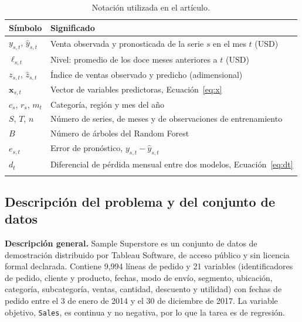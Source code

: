 \documentclass[pdflatex,sn-mathphys-num]{sn-jnl}
\begin{document}
\begin{table}[!htb]
\caption{Notación utilizada en el artículo.}\label{tab:notacion}
\begin{tabular}{@{}ll@{}}
\toprule
Símbolo & Significado \\
\midrule
$y_{s,t}$, $\hat{y}_{s,t}$ & Venta observada y pronosticada de la serie $s$ en el mes $t$ (USD) \\
$\ell_{s,t}$ & Nivel: promedio de los doce meses anteriores a $t$ (USD) \\
$z_{s,t}$, $\hat{z}_{s,t}$ & Índice de ventas observado y predicho (adimensional) \\
$\mathbf{x}_{s,t}$ & Vector de variables predictoras, Ecuación~\eqref{eq:x} \\
$c_s$, $r_s$, $m_t$ & Categoría, región y mes del año \\
$S$, $T$, $n$ & Número de series, de meses y de observaciones de entrenamiento \\
$B$ & Número de árboles del Random Forest \\
$e_{s,t}$ & Error de pronóstico, $y_{s,t}-\hat{y}_{s,t}$ \\
$d_t$ & Diferencial de pérdida mensual entre dos modelos, Ecuación~\eqref{eq:dt} \\
\botrule
\end{tabular}
\end{table}

\subsection{Descripción del problema y del conjunto de datos}\label{subsec:datos}

\textbf{Descripción general.} Sample Superstore \cite{superstore} es un conjunto de datos de demostración distribuido por Tableau Software, de acceso público y sin licencia formal declarada. Contiene 9{,}994 líneas de pedido y 21 variables (identificadores de pedido, cliente y producto, fechas, modo de envío, segmento, ubicación, categoría, subcategoría, ventas, cantidad, descuento y utilidad) con fechas de pedido entre el 3 de enero de 2014 y el 30 de diciembre de 2017. La variable objetivo, \texttt{Sales}, es continua y no negativa, por lo que la tarea es de regresión.
\end{document}
